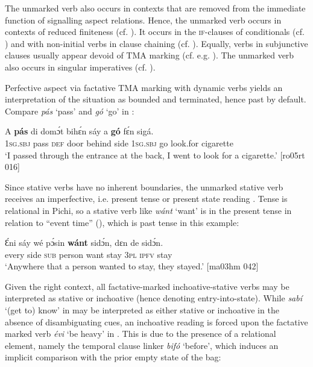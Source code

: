The unmarked verb also occurs in contexts that are removed from the immediate function of signalling aspect relations. Hence, the unmarked verb occurs in contexts of reduced finiteness (cf. ). It occurs in the \textsc{if-}clauses of conditionals (cf. ) and with non-initial verbs in clause chaining (cf. ). Equally, verbs in subjunctive clauses usually appear devoid of TMA marking (cf. e.g. ). The unmarked verb also occurs in singular imperatives (cf. ).


Perfective aspect via factative TMA marking with dynamic verbs yields an interpretation of the situation as bounded and terminated, hence past by default. Compare \textit{pás} ‘pass’ and \textit{gó} ‘go’ in : 



\ea%
    \label{ex:key:314}
    \gll A    \textbf{pás}    di  domɔ́t  bihɛ́n  sáy  a    \textbf{gó}  fɛ́n    sigá.\\
\textsc{1sg.sbj}  pass    \textsc{def}  door  behind  side  \textsc{1sg.sbj}  go  look.for  cigarette\\

\glt ‘I passed through the entrance at the back, I went to look for a cigarette.’ [ro05rt 016]
\z

Since stative verbs have no inherent boundaries, the unmarked stative verb receives an imperfective, i.e. present tense or present state reading . Tense is relational in Pichi, so a stative verb like \textit{wánt} ‘want’ is in the present tense in relation to “event time” (\citealt{ChungTimberlake1985}), which is past tense in this example:


\ea%
    \label{ex:key:315}
    \gll Ɛ́ni    sáy  wé  pɔ́sin  \textbf{wánt}  sidɔ́n,  dɛn  de  sidɔ́n.\\
every  side  \textsc{sub}  person  want  stay    \textsc{3pl}  \textsc{ipfv}  stay\\

\glt ‘Anywhere that a person wanted to stay, they stayed.’ [ma03hm 042]
\z

Given the right context, all factative-marked inchoative-stative verbs may be interpreted as stative or inchoative (hence denoting entry-into-state). While \textit{sabí} ‘(get to) know’ in  may be interpreted as either stative or inchoative in the absence of disambiguating cues, an inchoative reading is forced upon the factative marked verb \textit{évi} ‘be heavy’ in . This is due to the presence of a relational element, namely the temporal clause linker \textit{bifó} ‘before’, which induces an implicit comparison with the prior empty state of the bag:


